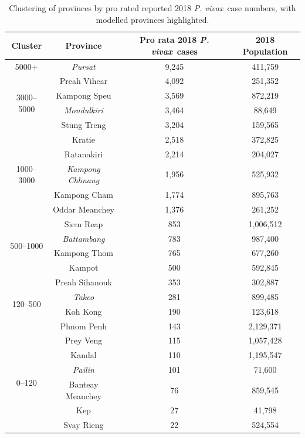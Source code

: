 \documentclass[doublespacing]{bmcart}
\newcommand{\pv}{\textit{P. vivax}}
\begin{document}
{\tiny
\begin{table}
\begin{center}
\begin{tabular}{c c c c}
\hline
Cluster & Province & Pro rata 2018 \pv~cases & 2018 Population \\
\hline
5000+ & \emph{Pursat} & 9,245 & 411,759\\
\hline
\multirow{4}{*}{3000--5000}& Preah Vihear & 4,092 & 251,352\\
& Kampong Speu & 3,569 & 872,219\\
& \emph{Mondulkiri} & 3,464 & 88,649\\
& Stung Treng & 3,204 & 159,565\\
\hline
\multirow{5}{*}{1000--3000}& Kratie & 2,518 & 372,825\\
& Ratanakiri & 2,214 & 204,027\\
& \emph{Kampong Chhnang} & 1,956 & 525,932\\
& Kampong Cham & 1,774 & 895,763\\
& Oddar Meanchey & 1,376 & 261,252\\
\hline
\multirow{4}{*}{500--1000}& Siem Reap & 853 & 1,006,512\\
& \emph{Battambang} & 783 & 987,400\\
& Kampong Thom & 765 & 677,260\\
& Kampot & 500 & 592,845\\
\hline
\multirow{4}{*}{120--500}& Preah Sihanouk & 353 & 302,887\\
& \emph{Takeo} & 281 & 899,485\\
& Koh Kong & 190 & 123,618\\
& Phnom Penh & 143 & 2,129,371\\
\hline
\multirow{6}{*}{0--120}& Prey Veng & 115 & 1,057,428\\
& Kandal & 110 & 1,195,547\\
& \emph{Pailin} & 101 & 71,600\\
& Banteay Meanchey & 76 & 859,545\\
& Kep & 27 & 41,798\\
& Svay Rieng & 22 & 524,554\\
\hline

\end{tabular}
\end{center}
\caption{Clustering of provinces by pro rated reported 2018 \pv~case numbers, with modelled provinces highlighted.\label{tab:clusters}\\
}
\end{table}
}
\end{document}
